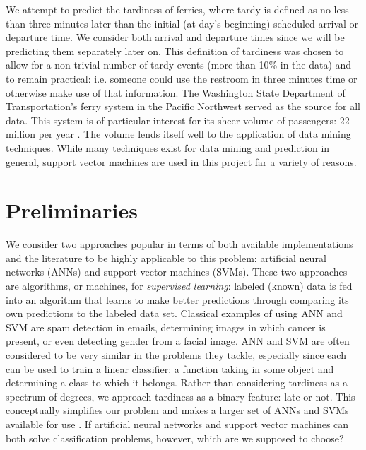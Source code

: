 \documentclass[11pt]{article} %
\begin{document}
We attempt to predict the tardiness of ferries, where tardy is 
defined as no less than three minutes later than the initial (at day's beginning) 
scheduled arrival or departure time. We consider both arrival and departure 
times since we will be predicting them separately later on. This definition
of tardiness was chosen to allow for a non-trivial number of tardy events 
(more than 10\% in the data) and to remain practical: i.e. someone could use the
restroom in three minutes time or otherwise make use of that information. The 
Washington State Department of Transportation's ferry system in the Pacific
Northwest served as the source for all data. This system is of 
particular interest for its sheer volume of passengers: 22 million per year 
\cite{wsfTraffic}.  The volume lends itself well to the application of 
data mining techniques. While many techniques exist for data mining and 
prediction in general, support vector machines are used in this project far a 
variety of reasons.


\section{Preliminaries}
\label{sec:prelims}
We consider two approaches popular in terms of both available implementations and 
the literature to be highly applicable to this problem:
artificial neural networks (ANNs) and support vector machines (SVMs). These two 
approaches are algorithms, or machines, for
\textit{supervised learning}: labeled (known) data is fed into an
algorithm that learns to make better predictions through comparing its own 
predictions to the labeled data set. Classical examples of using ANN and SVM are
spam detection in emails, determining images in which cancer is present, or even
detecting gender from a facial image. ANN and SVM are often considered to be
very similar in the problems they tackle, especially since each can
be used to train a linear classifier: a function taking in some object and 
determining a class to which it belongs. Rather than considering tardiness as a 
spectrum of degrees, we approach tardiness as a binary feature: late or not. This 
conceptually simplifies our problem and makes a larger set of ANNs and SVMs 
available for use .  If artificial neural networks and support vector machines 
can both solve classification problems, however, which are we supposed to choose?
\end{document}
